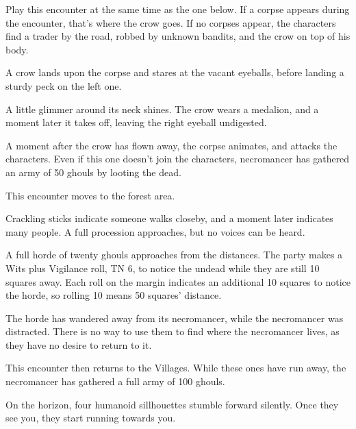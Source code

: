 \begin{multicols}{2}

Play this encounter at the same time as the one below.  If a corpse appears during the encounter, that's where the crow goes.  If no corpses appear, the characters find a trader by the road, robbed by unknown bandits, and the crow on top of his body.

\begin{boxtext}
	A crow lands upon the corpse and stares at the vacant eyeballs, before landing a sturdy peck on the left one.

	A little glimmer around its neck shines.  The crow wears a medalion, and a moment later it takes off, leaving the right eyeball undigested.

\end{boxtext}

A moment after the crow has flown away, the corpse animates, and attacks the characters.  Even if this one doesn't join the characters, \gls{necromancer} has gathered an army of 50 ghouls by looting the dead.

\ghoul

This encounter moves to the forest area.


\begin{boxtext}
	Crackling sticks indicate someone walks closeby, and a moment later indicates many people.  A full procession approaches, but no voices can be heard.
\end{boxtext}

A full horde of twenty ghouls approaches from the distances.  The party makes a Wits plus Vigilance roll, TN 6, to notice the undead while they are still 10 squares away.  Each roll on the margin indicates an additional 10 squares to notice the horde, so rolling 10 means 50 squares' distance.

The horde has wandered away from its necromancer, while the necromancer was distracted.  There is no way to use them to find where the necromancer lives, as they have no desire to return to it.

This encounter then returns to the Villages.  While these ones have run away, the necromancer has gathered a full army of 100 ghouls.


\ghoul


\begin{boxtext}
	On the horizon, four humanoid sillhouettes stumble forward silently.  Once they see you, they start running towards you.
\end{boxtext}


\end{multicols}
